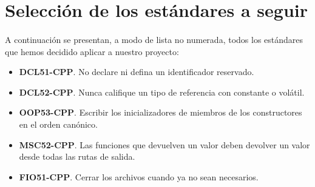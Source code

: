 \section{Selección de los estándares a seguir}

\paragraph{}A continuación se presentan, a modo de lista no numerada, todos los estándares que hemos decidido aplicar a nuestro proyecto:

\begin{itemize}
	\item \textbf{DCL51-CPP}. No declare ni defina un identificador reservado.
	\item \textbf{DCL52-CPP}. Nunca califique un tipo de referencia con constante o volátil.
	\item \textbf{OOP53-CPP}. Escribir los inicializadores de miembros de los constructores en el orden canónico.
	\item \textbf{MSC52-CPP}. Las funciones que devuelven un valor deben devolver un valor desde todas las rutas de salida.
	\item \textbf{FIO51-CPP}. Cerrar los archivos cuando ya no sean necesarios.
\end{itemize}